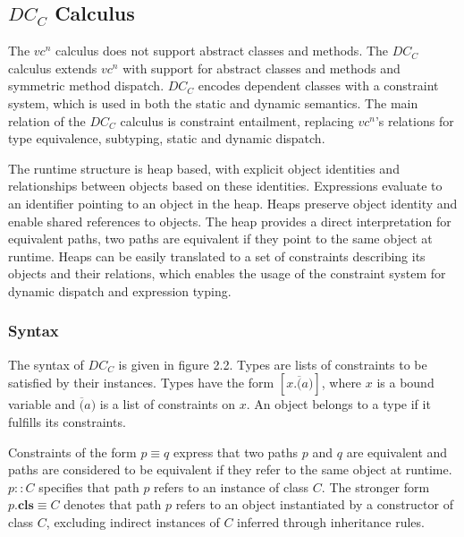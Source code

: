 \subsection{$DC_C$ Calculus}
The $vc^n$ calculus does not support abstract classes and methods.
The $DC_C$ calculus\cite{vaidas:thesis} extends $vc^n$ with support for abstract classes and methods
and symmetric method dispatch.
$DC_C$ encodes dependent classes with a constraint system,
which is used in both the static and dynamic semantics.
The main relation of the $DC_C$ calculus is constraint entailment,
replacing $vc^n$'s relations for type equivalence, subtyping, static and dynamic dispatch.

The runtime structure is heap based,
with explicit object identities
and relationships between objects based on these identities.
Expressions evaluate to an identifier pointing to an object in the heap.
Heaps preserve object identity and enable shared references to objects.
The heap provides a direct interpretation for equivalent paths,
two paths are equivalent if they point to the same object at runtime.
Heaps can be easily translated to a set of constraints describing its objects and their relations,
which enables the usage of the constraint system for dynamic dispatch and expression typing.
\subsubsection{Syntax}
The syntax of $DC_C$ is given in figure 2.2.
Types are lists of constraints to be satisfied by their instances.
Types have the form $[x. \overline(a)]$, where $x$ is a bound variable
and $\overline(a)$ is a list of constraints on $x$.
An object belongs to a type if it fulfills its constraints.

Constraints of the form $p \equiv q$ express that two paths $p$ and $q$ are equivalent
and paths are considered to be equivalent if they refer to the same object at runtime.
$p :: C$ specifies that path $p$ refers to an instance of class $C$.
The stronger form $p.\textbf{cls} \equiv C$ denotes that
path $p$ refers to an object instantiated by a constructor of class $C$,
excluding indirect instances of $C$ inferred through inheritance rules.

